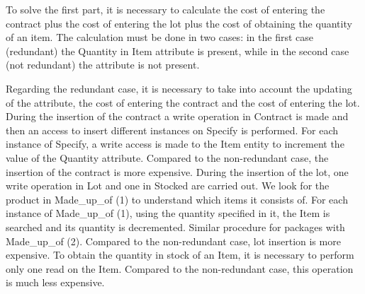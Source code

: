 To solve the first part, it is necessary to calculate the cost of entering the contract plus the cost of entering the lot plus the cost of obtaining the quantity of an item. The calculation must be done in two cases: in the first case (redundant) the Quantity in Item attribute is present, while in the second case (not redundant) the attribute is not present.

Regarding the redundant case, it is necessary to take into account the updating of the attribute, the cost of entering the contract and the cost of entering the lot.
During the insertion of the contract a write operation in Contract is made and then an access to insert different instances on Specify is performed. For each instance of Specify, a write access is made to the Item entity to increment the value of the Quantity attribute. Compared to the non-redundant case, the insertion of the contract is more expensive.
During the insertion of the lot, one write operation in Lot and one in Stocked are carried out. We look for the product in Made\_up\_of (1) to understand which items it consists of. For each instance of Made\_up\_of (1), using the quantity specified in it, the Item is searched and its quantity is decremented. Similar procedure for packages with Made\_up\_of (2). Compared to the non-redundant case, lot insertion is more expensive.
To obtain the quantity in stock of an Item, it is necessary to perform only one read on the Item. Compared to the non-redundant case, this operation is much less expensive.

